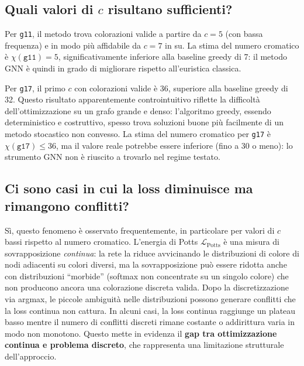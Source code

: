 \documentclass{article}
\begin{document}
\subsection*{Quali valori di $c$ risultano sufficienti?}

Per \texttt{g11}, il metodo trova colorazioni valide a partire da $c = 5$ (con bassa
frequenza) e in modo più affidabile da $c = 7$ in su. La stima del numero cromatico è
$\chi(\texttt{g11}) = 5$, significativamente inferiore alla baseline greedy di 7: il
metodo GNN è quindi in grado di migliorare rispetto all'euristica classica.

Per \texttt{g17}, il primo $c$ con colorazioni valide è 36, superiore alla baseline greedy
di 32. Questo risultato apparentemente controintuitivo riflette la difficoltà
dell'ottimizzazione su un grafo grande e denso: l'algoritmo greedy, essendo deterministico
e costruttivo, spesso trova soluzioni buone più facilmente di un metodo stocastico non
convesso. La stima del numero cromatico per \texttt{g17} è $\chi(\texttt{g17}) \leq 36$,
ma il valore reale potrebbe essere inferiore (fino a 30 o meno): lo strumento GNN non è
riuscito a trovarlo nel regime testato.

\subsection*{Ci sono casi in cui la loss diminuisce ma rimangono conflitti?}

Sì, questo fenomeno è osservato frequentemente, in particolare per valori di $c$ bassi
rispetto al numero cromatico. L'energia di Potts $\mathcal{L}_{\mathrm{Potts}}$ è una
misura di sovrapposizione \emph{continua}: la rete la riduce avvicinando le distribuzioni
di colore di nodi adiacenti su colori diversi, ma la sovrapposizione può essere ridotta
anche con distribuzioni ``morbide'' (softmax non concentrate su un singolo colore) che non
producono ancora una colorazione discreta valida. Dopo la discretizzazione via argmax, le
piccole ambiguità nelle distribuzioni possono generare conflitti che la loss continua non
cattura. In alcuni casi, la loss continua raggiunge un plateau basso mentre il numero di
conflitti discreti rimane costante o addirittura varia in modo non monotono. Questo mette
in evidenza il \textbf{gap tra ottimizzazione continua e problema discreto}, che
rappresenta una limitazione strutturale dell'approccio.
\end{document}
